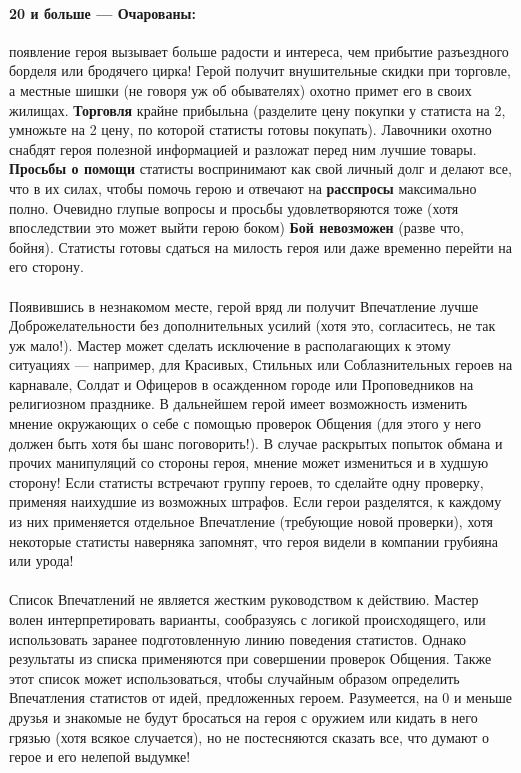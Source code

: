 \paragraph{20 и больше — Очарованы:} появление героя вызывает больше радости и интереса, чем прибытие разъездного борделя или бродячего цирка! Герой получит внушительные скидки при торговле, а местные шишки (не говоря уж об обывателях) охотно примет его в своих жилищах.
\textbf{Торговля} крайне прибыльна (разделите цену покупки у статиста на 2, умножьте на 2 цену, по которой статисты готовы покупать). Лавочники охотно снабдят героя полезной информацией и разложат перед ним лучшие товары.
\textbf{Просьбы о помощи} статисты воспринимают как свой личный долг и делают все, что в их силах, чтобы помочь герою и отвечают на \textbf{расспросы} максимально полно. Очевидно глупые вопросы и просьбы удовлетворяются тоже (хотя впоследствии это может выйти герою боком)
\textbf{Бой невозможен} (разве что, бойня). Статисты готовы сдаться на милость героя или даже временно перейти на его сторону.
\paragraph{}
Появившись в незнакомом месте, герой вряд ли получит Впечатление лучше Доброжелательности без дополнительных усилий (хотя это, согласитесь, не так уж мало!). Мастер может сделать исключение в располагающих к этому ситуациях — например, для Красивых, Стильных или Соблазнительных героев на карнавале, Солдат и Офицеров в осажденном городе или Проповедников на религиозном празднике.
\newline
В дальнейшем герой имеет возможность изменить мнение окружающих о себе с помощью проверок Общения (для этого у него должен быть хотя бы шанс поговорить!). В случае раскрытых попыток обмана и прочих манипуляций со стороны героя, мнение может измениться и в худшую сторону!
\newline
Если статисты встречают группу героев, то сделайте одну проверку, применяя наихудшие из возможных штрафов. Если герои разделятся, к каждому из них применяется отдельное Впечатление (требующие новой проверки), хотя некоторые статисты наверняка запомнят, что героя видели в компании грубияна или урода!
\paragraph{}
Список Впечатлений не является жестким руководством к действию. Мастер волен интерпретировать варианты, сообразуясь с логикой происходящего, или использовать заранее подготовленную линию поведения статистов. Однако результаты из списка применяются при совершении проверок Общения.
\newline
Также этот список может использоваться, чтобы случайным образом определить Впечатления статистов от идей, предложенных героем. Разумеется, на 0 и меньше друзья и знакомые не будут бросаться на героя с оружием или кидать в него грязью (хотя всякое случается), но не постесняются сказать все, что думают о герое и его нелепой выдумке!
